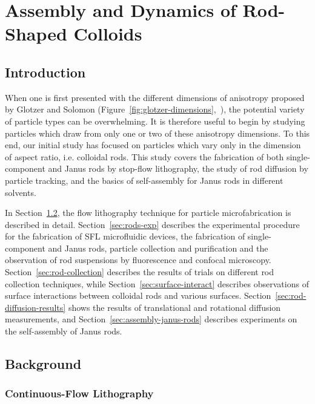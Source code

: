 \chapter{Assembly and Dynamics of Rod-Shaped Colloids}
\label{ch:rods}
\section{Introduction}

When one is first presented with the different dimensions of anisotropy proposed by 
Glotzer and Solomon (Figure~\ref{fig:glotzer-dimensions},~\cite{glotzer-solomon}), the
potential variety of particle types can be overwhelming. It is therefore useful to begin by studying 
particles which draw from only one or two of these anisotropy dimensions. To this end, our
initial study has focused on particles which vary only in the dimension of 
aspect ratio, i.e. colloidal rods. This study covers the fabrication of both single-component and 
Janus rods by stop-flow lithography, the study of rod diffusion by particle tracking, and the basics
of self-assembly for Janus rods in different solvents.

In Section~\ref{sec:rods-background}, the flow lithography technique for particle microfabrication
is described in detail. Section~\ref{sec:rods-exp} describes the experimental procedure for 
the fabrication of SFL microfluidic devices, the fabrication of single-component and Janus rods,
particle collection and purification
and the observation of rod suspensions by fluorescence and confocal microscopy. 
Section~\ref{sec:rod-collection} describes the results of trials on different rod collection
techniques, while Section~\ref{sec:surface-interact} describes observations of 
surface interactions between colloidal rods and various surfaces. Section~\ref{sec:rod-diffusion-results}
shows the results of translational and rotational diffusion measurements, and 
Section~\ref{sec:assembly-janus-rods} describes experiments on the 
self-assembly of Janus rods.

\section{Background}
\label{sec:rods-background}

\subsection{Continuous-Flow Lithography}

